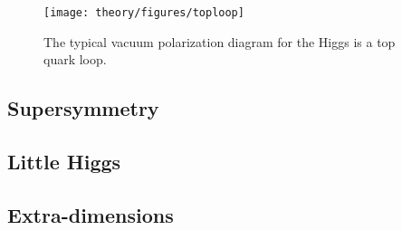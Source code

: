 \begin{figure}[htb]\begin{center}
\texttt{[image: theory/figures/toploop]}
\caption{The typical vacuum polarization diagram for the Higgs is a top quark loop.}
\label{topLoop}\end{center}\end{figure}



\subsection{Supersymmetry}

\subsection{Little Higgs}

\subsection{Extra-dimensions}

